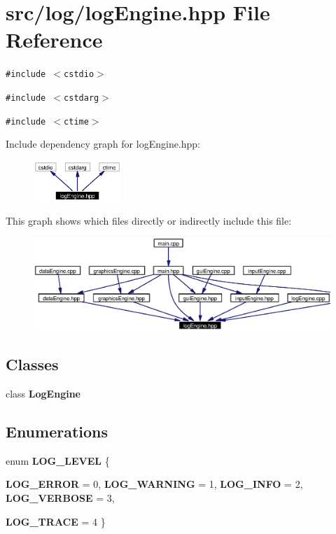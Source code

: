 \section{src/log/log\-Engine.hpp File Reference}
\label{logEngine_8hpp}
{\tt \#include $<$cstdio$>$}\par
{\tt \#include $<$cstdarg$>$}\par
{\tt \#include $<$ctime$>$}\par


Include dependency graph for log\-Engine.hpp:\begin{figure}[H]
\begin{center}
\leavevmode
\includegraphics[width=94pt]{logEngine_8hpp__incl}
\end{center}
\end{figure}


This graph shows which files directly or indirectly include this file:\begin{figure}[H]
\begin{center}
\leavevmode
\includegraphics[width=355pt]{logEngine_8hpp__dep__incl}
\end{center}
\end{figure}
\subsection*{Classes}
\begin{CompactItemize}
\item 
class {\bf Log\-Engine}
\end{CompactItemize}
\subsection*{Enumerations}
\begin{CompactItemize}
\item 
enum {\bf LOG\_\-LEVEL} \{ \par
{\bf LOG\_\-ERROR} =  0, 
{\bf LOG\_\-WARNING} =  1, 
{\bf LOG\_\-INFO} =  2, 
{\bf LOG\_\-VERBOSE} =  3, 
\par
{\bf LOG\_\-TRACE} =  4
 \}
\end{CompactItemize}


